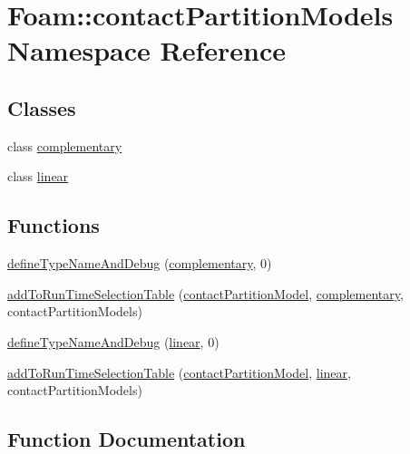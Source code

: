 \hypertarget{namespaceFoam_1_1contactPartitionModels}{}\section{Foam\+:\+:contact\+Partition\+Models Namespace Reference}
\label{namespaceFoam_1_1contactPartitionModels}
\subsection*{Classes}
\begin{DoxyCompactItemize}
\item 
class \hyperlink{classFoam_1_1contactPartitionModels_1_1complementary}{complementary}
\item 
class \hyperlink{classFoam_1_1contactPartitionModels_1_1linear}{linear}
\end{DoxyCompactItemize}
\subsection*{Functions}
\begin{DoxyCompactItemize}
\item 
\hyperlink{namespaceFoam_1_1contactPartitionModels_a772b98388e64dfb42bb7817337e74cfd}{define\+Type\+Name\+And\+Debug} (\hyperlink{classFoam_1_1contactPartitionModels_1_1complementary}{complementary}, 0)
\item 
\hyperlink{namespaceFoam_1_1contactPartitionModels_a615579d990262508ff357f028543f335}{add\+To\+Run\+Time\+Selection\+Table} (\hyperlink{classFoam_1_1contactPartitionModel}{contact\+Partition\+Model}, \hyperlink{classFoam_1_1contactPartitionModels_1_1complementary}{complementary}, contact\+Partition\+Models)
\item 
\hyperlink{namespaceFoam_1_1contactPartitionModels_afaf5c6cd9cf5cbc076b5bb60f0ef662b}{define\+Type\+Name\+And\+Debug} (\hyperlink{classFoam_1_1contactPartitionModels_1_1linear}{linear}, 0)
\item 
\hyperlink{namespaceFoam_1_1contactPartitionModels_a694ddba0cb6adcccd63b6c1f0ec1f8e2}{add\+To\+Run\+Time\+Selection\+Table} (\hyperlink{classFoam_1_1contactPartitionModel}{contact\+Partition\+Model}, \hyperlink{classFoam_1_1contactPartitionModels_1_1linear}{linear}, contact\+Partition\+Models)
\end{DoxyCompactItemize}


\subsection{Function Documentation}
\mbox{\label{namespaceFoam_1_1contactPartitionModels_a772b98388e64dfb42bb7817337e74cfd}} 
